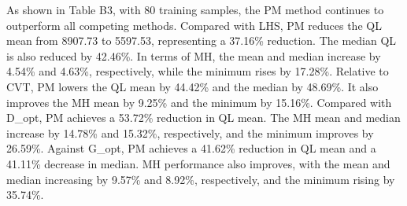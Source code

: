 \documentclass[]{interact}
\theoremstyle{plain}%
\theoremstyle{definition}
\theoremstyle{remark}
\begin{document}
As shown in Table B3, with 80 training samples, the PM method continues to outperform all competing methods. Compared with LHS, PM reduces the QL mean from 8907.73 to 5597.53, representing a 37.16\% reduction. The median QL is also reduced by 42.46\%. In terms of MH, the mean and median increase by 4.54\% and 4.63\%, respectively, while the minimum rises by 17.28\%. Relative to CVT, PM lowers the QL mean by 44.42\% and the median by 48.69\%. It also improves the MH mean by 9.25\% and the minimum by 15.16\%. Compared with D\_opt, PM achieves a 53.72\% reduction in QL mean. The MH mean and median increase by 14.78\% and 15.32\%, respectively, and the minimum improves by 26.59\%. Against G\_opt, PM achieves a 41.62\% reduction in QL mean and a 41.11\% decrease in median. MH performance also improves, with the mean and median increasing by 9.57\% and 8.92\%, respectively, and the minimum rising by 35.74\%.
\end{document}
